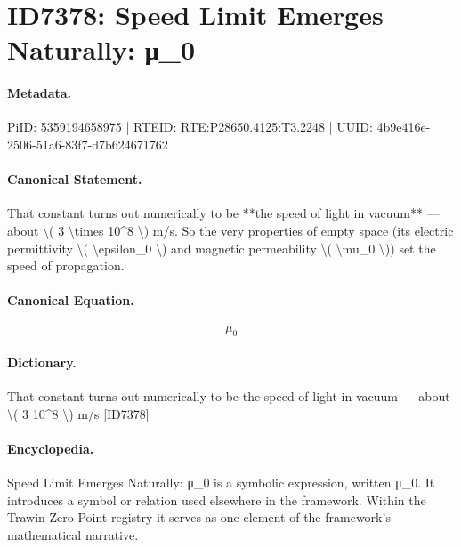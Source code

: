 \section*{ID7378: Speed Limit Emerges Naturally: μ\_0}
\paragraph{Metadata.}
PiID: 5359194658975 | RTEID: RTE:P28650.4125:T3.2248 | UUID: 4b9e416e-2506-51a6-83f7-d7b624671762

\paragraph{Canonical Statement.}
That constant turns out numerically to be **the speed of light in vacuum** — about \textbackslash{}( 3 \textbackslash{}times 10\textasciicircum{}8 \textbackslash{}) m/s. So the very properties of empty space (its electric permittivity \textbackslash{}( \textbackslash{}epsilon\_0 \textbackslash{}) and magnetic permeability \textbackslash{}( \textbackslash{}mu\_0 \textbackslash{})) set the speed of propagation.

\paragraph{Canonical Equation.}
\[
\mu_0
\]

\paragraph{Dictionary.}
That constant turns out numerically to be the speed of light in vacuum — about \textbackslash{}( 3 10\textasciicircum{}8 \textbackslash{}) m/s [ID7378]

\paragraph{Encyclopedia.}
Speed Limit Emerges Naturally: μ\_0 is a symbolic expression, written μ\_0. It introduces a symbol or relation used elsewhere in the framework. Within the Trawin Zero Point registry it serves as one element of the framework's mathematical narrative.
